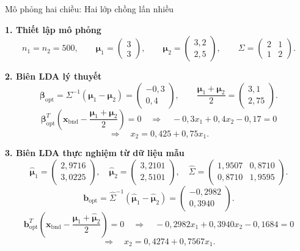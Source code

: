 \documentclass{beamer}
\begin{document}
\begin{frame}{Mô phỏng hai chiều: Hai lớp chồng lấn nhiều}
	\scriptsize
	\setlength{\abovedisplayskip}{3pt}
	\setlength{\belowdisplayskip}{3pt}
	
	\textbf{1. Thiết lập mô phỏng}
	\[
	n_1=n_2=500,\qquad
	\bm{\mu}_1=
	\begin{pmatrix}
		3\\
		3
	\end{pmatrix},
	\qquad
	\bm{\mu}_2=
	\begin{pmatrix}
		3{,}2\\
		2{,}5
	\end{pmatrix},
	\qquad
	\Sigma=
	\begin{pmatrix}
		2 & 1\\
		1 & 2
	\end{pmatrix}.
	\]
	
	\textbf{2. Biên LDA lý thuyết}
	\[
	\bm{\beta}_{\text{opt}}
	=
	\Sigma^{-1}(\bm{\mu}_1-\bm{\mu}_2)
	=
	\begin{pmatrix}
		-0{,}3\\
		0{,}4
	\end{pmatrix},
	\qquad
	\frac{\bm{\mu}_1+\bm{\mu}_2}{2}
	=
	\begin{pmatrix}
		3{,}1\\
		2{,}75
	\end{pmatrix}.
	\]
	\[
	\bm{\beta}_{\text{opt}}^T
	\left(
	\bm{x}_{\text{bnd}}
	-
	\frac{\bm{\mu}_1+\bm{\mu}_2}{2}
	\right)
	=0
	\quad \Rightarrow \quad
	-0{,}3x_1+0{,}4x_2-0{,}17=0
	\]
	\[
	\Rightarrow \quad
	\boxed{x_2=0{,}425+0{,}75x_1}.
	\]
	
	\textbf{3. Biên LDA thực nghiệm từ dữ liệu mẫu}
	\[
	\widehat{\bm{\mu}}_1=
	\begin{pmatrix}
		2{,}9716\\
		3{,}0225
	\end{pmatrix},
	\quad
	\widehat{\bm{\mu}}_2=
	\begin{pmatrix}
		3{,}2101\\
		2{,}5101
	\end{pmatrix},
	\quad
	\widehat{\Sigma}=
	\begin{pmatrix}
		1{,}9507 & 0{,}8710\\
		0{,}8710 & 1{,}9595
	\end{pmatrix}.
	\]
	\[
	\bm{b}_{\text{opt}}
	=
	\widehat{\Sigma}^{-1}
	(\widehat{\bm{\mu}}_1-\widehat{\bm{\mu}}_2)
	=
	\begin{pmatrix}
		-0{,}2982\\
		0{,}3940
	\end{pmatrix}.
	\]
	\[
	\bm{b}_{\text{opt}}^T
	\left(
	\bm{x}_{\text{bnd}}
	-
	\frac{\widehat{\bm{\mu}}_1+\widehat{\bm{\mu}}_2}{2}
	\right)
	=0
	\quad \Rightarrow \quad
	-0{,}2982x_1+0{,}3940x_2-0{,}1684=0
	\]
	\[
	\Rightarrow \quad
	\boxed{x_2=0{,}4274+0{,}7567x_1}.
	\]
\end{frame}
\end{document}
